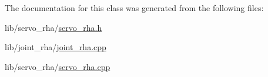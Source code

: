 The documentation for this class was generated from the following files\+:\begin{DoxyCompactItemize}
\item 
lib/servo\+\_\+rha/\hyperlink{servo__rha_8h}{servo\+\_\+rha.\+h}\item 
lib/joint\+\_\+rha/\hyperlink{joint__rha_8cpp}{joint\+\_\+rha.\+cpp}\item 
lib/servo\+\_\+rha/\hyperlink{servo__rha_8cpp}{servo\+\_\+rha.\+cpp}\end{DoxyCompactItemize}

